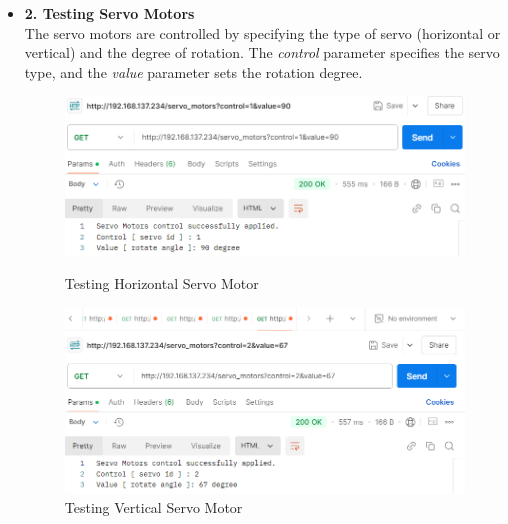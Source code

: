 \documentclass[12pt,a4paper]{report}
\begin{document}
\begin{enumerate}
\begin{itemize}
    \item \textbf{2. Testing Servo Motors}
    \\ The servo motors are controlled by specifying the type of servo (horizontal or vertical) and the degree of rotation. The \textit{control} parameter specifies the servo type, and the \textit{value} parameter sets the rotation degree.
    \begin{figure}[H]
        \centering
        \begin{minipage}{0.45\textwidth}
            \centering
            \includegraphics[width=\textwidth]{servoMotorTest1}  %
            \caption{Testing Horizontal Servo Motor}
            \label{fig:servoMotorTest1}
        \end{minipage} \hfill
        \begin{minipage}{0.45\textwidth}
            \centering
            \includegraphics[width=\textwidth]{servoMotorTest2}  %
            \caption{Testing Vertical Servo Motor}
            \label{fig:servoMotorTest2}
        \end{minipage}
    \end{figure}


\end{itemize}
\end{enumerate}
\end{document}
